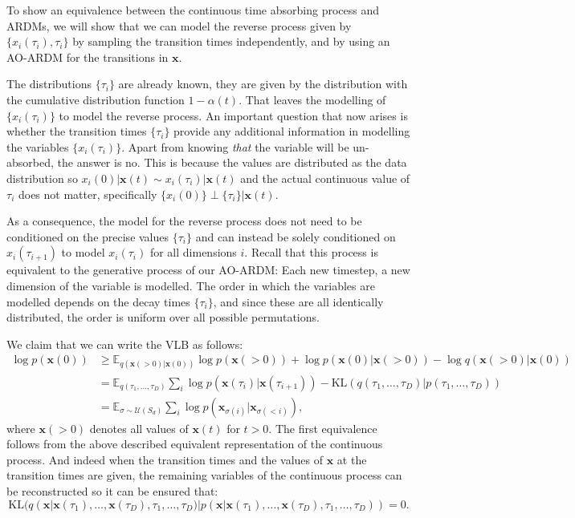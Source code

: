 \documentclass{article} \usepackage{iclr2022_conference,times}
\def\vx{{\bm{x}}}
\begin{document}
To show an equivalence between the continuous time absorbing process and ARDMs, we will show that we can model the reverse process given by $\{x_i(\tau_i), \tau_i\}$ by sampling the transition times independently, and by using an AO-ARDM for the transitions in $\vx$. 


The distributions $\{\tau_i\}$ are already known, they are given by the distribution with the cumulative distribution function $1 - \alpha(t)$. That leaves the modelling of $\{x_i(\tau_i)\}$ to model the reverse process. An important question that now arises is whether the transition times $\{\tau_i\}$ provide any additional information in modelling the variables $\{x_i(\tau_i)\}$. Apart from knowing \textit{that} the variable will be un-absorbed, the answer is no. This is because the values are distributed as the data distribution so $x_i(0) | \vx(t) \sim x_i(\tau_i) | \vx(t)$ and the actual continuous value of $\tau_i$ does not matter, specifically $\{x_i(0)\} \perp \{\tau_i\} | \vx(t)$. 

As a consequence, the model for the reverse process does not need to be conditioned on the precise values $\{\tau_i\}$ and can instead be solely conditioned on $x_i(\tau_{i+1})$ to model $x_i(\tau_i)$ for all dimensions $i$. Recall that this process is equivalent to the generative process of our AO-ARDM: Each new timestep, a new dimension of the variable is modelled. The order in which the variables are modelled depends on the decay times $\{\tau_i\}$, and since these are all identically distributed, the order is uniform over all possible permutations.  


We claim that we can write the VLB as follows:
\begin{align*}
\log p(\vx(0)) & \geq \mathbb{E}_{q(\vx(>0)|\vx(0))} \log p(\vx(>\!0)) + \log p(\vx(0) | \vx(>\!0)) - \log q(\vx(>\!0)|\vx(0)) \\
& = \mathbb{E}_{q(\tau_1, \ldots, \tau_D)} \sum_{i} \log p(\vx(\tau_{i})|\vx(\tau_{i+1})) - \mathrm{KL}(q(\tau_{1}, \ldots, \tau_D) | p(\tau_1, \ldots, \tau_D)) \\
& = \mathbb{E}_{\sigma \sim \mathcal{U}(S_d)} \sum_{i} \log p(\mathbf{x}_{\sigma(i)}|\vx_{\sigma(<i)}),
\end{align*}
where $\vx(>\!0)$ denotes all values of $\vx(t)$ for $t>0$. The first equivalence follows from the above described equivalent representation of the continuous process. And indeed when the transition times and the values of $\vx$ at the transition times are given, the remaining variables of the continuous process can be reconstructed so it can be ensured that:
$$\mathrm{KL}(q(\vx | \vx(\tau_1), \ldots, \vx(\tau_D), \tau_1, \ldots, \tau_D) | p(\vx | \vx(\tau_1), \ldots, \vx(\tau_D), \tau_1, \ldots, \tau_D)) = 0.$$
\end{document}
